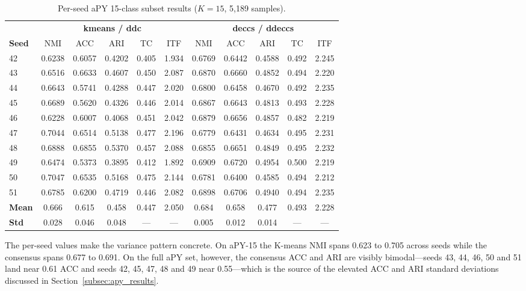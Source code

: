 \begin{table}[H]
    \centering
    \footnotesize
    \setlength{\tabcolsep}{4pt}
    \caption[Per-seed aPY 15-class results]{Per-seed aPY 15-class subset results ($K = 15$, 5{,}189 samples).}
    \label{tab:apy15_perseed}
    \begin{tabular}{lccccc|ccccc}
        \hline
        & \multicolumn{5}{c|}{\textbf{kmeans / ddc}} & \multicolumn{5}{c}{\textbf{deccs / ddeccs}} \\
        \textbf{Seed} & NMI & ACC & ARI & TC & ITF & NMI & ACC & ARI & TC & ITF \\
        \hline
        42 & 0.6238 & 0.6057 & 0.4202 & 0.405 & 1.934 & 0.6769 & 0.6442 & 0.4588 & 0.492 & 2.245 \\
        43 & 0.6516 & 0.6633 & 0.4607 & 0.450 & 2.087 & 0.6870 & 0.6660 & 0.4852 & 0.494 & 2.220 \\
        44 & 0.6643 & 0.5741 & 0.4288 & 0.447 & 2.020 & 0.6800 & 0.6458 & 0.4670 & 0.492 & 2.235 \\
        45 & 0.6689 & 0.5620 & 0.4326 & 0.446 & 2.014 & 0.6867 & 0.6643 & 0.4813 & 0.493 & 2.228 \\
        46 & 0.6228 & 0.6007 & 0.4068 & 0.451 & 2.042 & 0.6879 & 0.6656 & 0.4857 & 0.482 & 2.219 \\
        47 & 0.7044 & 0.6514 & 0.5138 & 0.477 & 2.196 & 0.6779 & 0.6431 & 0.4634 & 0.495 & 2.231 \\
        48 & 0.6888 & 0.6855 & 0.5370 & 0.457 & 2.088 & 0.6855 & 0.6651 & 0.4849 & 0.495 & 2.232 \\
        49 & 0.6474 & 0.5373 & 0.3895 & 0.412 & 1.892 & 0.6909 & 0.6720 & 0.4954 & 0.500 & 2.219 \\
        50 & 0.7047 & 0.6535 & 0.5168 & 0.475 & 2.144 & 0.6781 & 0.6400 & 0.4585 & 0.494 & 2.212 \\
        51 & 0.6785 & 0.6200 & 0.4719 & 0.446 & 2.082 & 0.6898 & 0.6706 & 0.4940 & 0.494 & 2.235 \\
        \hline
        \textbf{Mean} & 0.666 & 0.615 & 0.458 & 0.447 & 2.050 & 0.684 & 0.658 & 0.477 & 0.493 & 2.228 \\
        \textbf{Std} & 0.028 & 0.046 & 0.048 & --- & --- & 0.005 & 0.012 & 0.014 & --- & --- \\
        \hline
    \end{tabular}
\end{table}

The per-seed values make the variance pattern concrete. On aPY-15 the K-means NMI spans 0.623 to 0.705 across seeds while the consensus spans 0.677 to 0.691. On the full aPY set, however, the consensus ACC and ARI are visibly bimodal---seeds 43, 44, 46, 50 and 51 land near 0.61 ACC and seeds 42, 45, 47, 48 and 49 near 0.55---which is the source of the elevated ACC and ARI standard deviations discussed in Section~\ref{subsec:apy_results}.

